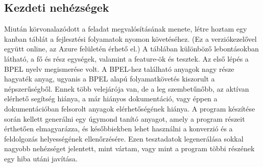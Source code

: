 \subsection{Kezdeti nehézségek}
Miután körvonalazódott a feladat megvalósításának menete, létre hoztam egy kanban táblát a fejlesztési folyamatok nyomon követéséhez. (Ez a verziókezelővel együtt online, az Azure felületén érhető el.) A táblában különböző lebontásokban látható, a fő és rész egységek, valamint a feature-ök és tesztek. Az első lépés a BPEL nyelv megismerése volt. A BPEL-hez található anyagok nagy része hagyaték anyag, ugyanis a BPEL alapú folyamatkövetés kiszorult a népszerűségből. Ennek több velejárója van, de a leg szembetűnőbb, az aktívan elérhető segítség hiánya, a már hiányos dokumentáció, vagy éppen a dokumentációban felsorolt anyagok elérhetőségének hiánya. A program készítése során kellett generálni egy úgymond tanító anyagot, amely a program részeit érthetően elmagyarázza, és későbbiekben lehet használni a konverzió és a feldolgozás helyességének ellenőrzésére. Ezen tesztadatok legenerálása sokkal nagyobb nehézséget jelentett, mint vártam, vagy mint a program többi részének egy hiba utáni javítása. \\
